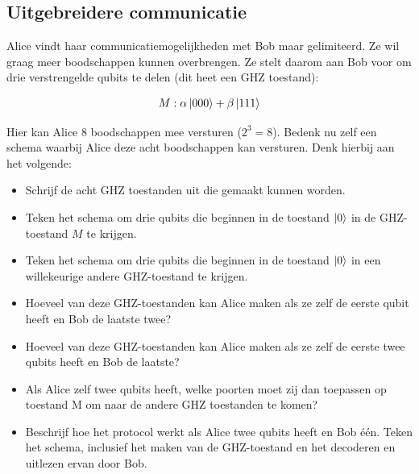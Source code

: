 \documentclass[../../main.tex]{subfiles}
\begin{document}
\subsection*{Uitgebreidere communicatie}
Alice vindt haar communicatiemogelijkheden met Bob maar gelimiteerd. Ze wil graag meer boodschappen kunnen overbrengen. Ze stelt daarom aan Bob voor om drie verstrengelde qubits te delen (dit heet een GHZ toestand):

\[\begin{aligned}
M: \alpha\ket{000}+\beta\ket{111}
\end{aligned}\]

Hier kan Alice 8 boodschappen mee versturen ($2^3=8$). Bedenk nu zelf een schema waarbij Alice deze acht boodschappen kan versturen. Denk hierbij aan het volgende:
\begin{itemize}
\item Schrijf de acht GHZ toestanden uit die gemaakt kunnen worden.
\item Teken het schema om drie qubits die beginnen in de toestand $\ket{0}$ in de GHZ-toestand $M$ te krijgen.
\item Teken het schema om drie qubits die beginnen in de toestand $\ket{0}$ in een willekeurige andere GHZ-toestand te krijgen.
\item Hoeveel van deze GHZ-toestanden kan Alice maken als ze zelf de eerste qubit heeft en Bob de laatste twee? 
\item Hoeveel van deze GHZ-toestanden kan Alice maken als ze zelf de eerste twee qubits heeft en Bob de laatste?
\item Als Alice zelf twee qubits heeft, welke poorten moet zij dan toepassen op toestand M om naar de andere GHZ toestanden te komen?
\item Beschrijf hoe het protocol werkt als Alice twee qubits heeft en Bob \'{e}\'{e}n. Teken het schema, inclusief het maken van de GHZ-toestand en het decoderen en uitlezen ervan door Bob.
\end{itemize}
\end{document}
